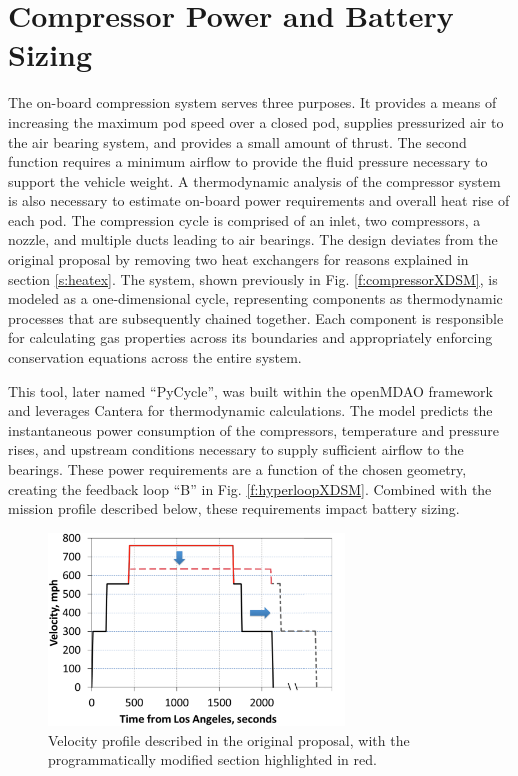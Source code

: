 \documentclass[heading.tex]{subfiles}
\begin{document}
\section{Compressor Power and Battery Sizing}
\label{sec:compressor-and-battery}

The on-board compression system serves three purposes.
It provides a means of increasing the maximum pod speed over a closed pod, supplies pressurized air to the air bearing system,
and provides a small amount of thrust.
The second function requires a minimum airflow to provide the fluid pressure necessary to support the vehicle weight.
A thermodynamic analysis of the compressor system is also necessary to
estimate on-board power requirements and overall heat rise of each pod.
The compression cycle is comprised of an inlet, two compressors, a nozzle, and multiple ducts leading to air bearings.
The design deviates from the original proposal by removing two heat exchangers for reasons explained in section \ref{s:heatex}.
The system, shown previously in Fig. \ref{f:compressorXDSM}, is modeled as a one-dimensional cycle,
representing components as thermodynamic processes that are subsequently chained together.
Each component is responsible for calculating gas properties across its boundaries
and appropriately enforcing conservation equations across the entire system.

This tool, later named ``PyCycle'', was built within the openMDAO framework and leverages Cantera
\cite{goodwin2009cantera} for thermodynamic calculations.
The model predicts the instantaneous power consumption of the compressors, temperature and pressure rises,
and upstream conditions necessary to supply sufficient airflow to the bearings.
These power requirements are a function of the chosen geometry, creating the feedback loop “B” in Fig. \ref{f:hyperloopXDSM}.
Combined with the mission profile described below, these requirements impact battery sizing.

\begin{figure}[hbtp]
\centering
\includegraphics[width=0.7\textwidth]{images/velocity_profile3.png}
\caption{Velocity profile described in the original proposal, with the programmatically modified section highlighted in red.}
\label{f:velocity}
\end{figure}
\end{document}

